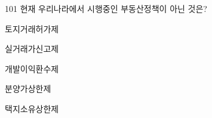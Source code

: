 \begin{question}{101}
현재 우리나라에서 시행중인 부동산정책이 아닌 것은?
\begin{choices}
  \item 토지거래허가제
  \item 실거래가신고제
  \item 개발이익환수제
  \item 분양가상한제
  \item 택지소유상한제
\end{choices}
\end{question}
